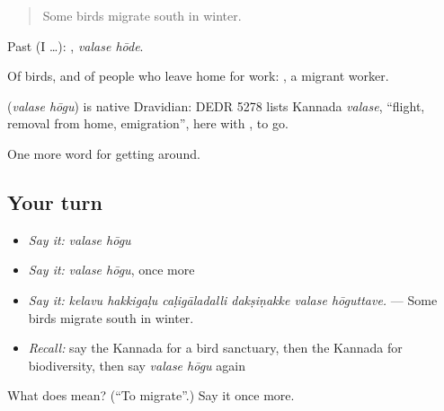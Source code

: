 \begin{quote}
Some birds migrate south in winter.
\end{quote}

Past (I …):  , \emph{valase hōde}.

Of birds, and of people who leave home for work:  , a migrant worker.

\begin{cousinweb}
\textbf{ } (\emph{valase hōgu}) is native Dravidian: DEDR 5278 lists Kannada \emph{valase}, \textquotedblleft{}flight, removal from home, emigration\textquotedblright{}, here with , to go.
\end{cousinweb}

\begin{grammarlens}[title={What you've built}]
One more word for getting around.
\end{grammarlens}

\subsection*{Your turn}
\begin{itemize}
\raggedright
  \item \emph{Say it:} \emph{valase hōgu}
  \item \emph{Say it:} \emph{valase hōgu}, once more
  \item \emph{Say it:} \emph{kelavu hakkigaḷu caḷigāladalli dakṣiṇakke valase hōguttave.} — Some birds migrate south in winter.
  \item \emph{Recall:} say the Kannada for a bird sanctuary, then the Kannada for biodiversity, then say \emph{valase hōgu} again
\end{itemize}

\begin{tcolorbox}[breakable,colback=teal!4,colframe=teal!35!black,title={Before you move on}]
What does   mean? (\textquotedblleft{}To migrate\textquotedblright{}.) Say it once more.
\end{tcolorbox}
